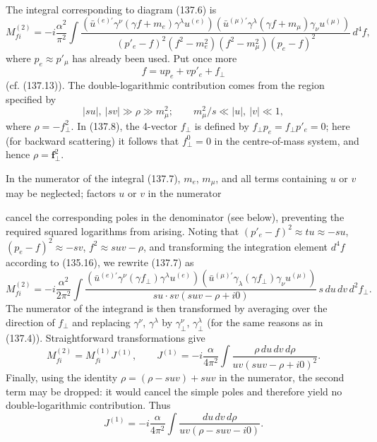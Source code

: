 The integral corresponding to diagram (137.6) is
\begin{equation}
M_{fi}^{(2)}=-i\frac{\alpha^2}{\pi^2}\int
\frac{(\bar u^{(e)'}\gamma^\nu(\gamma f+m_e)\gamma^\lambda u^{(e)})
(\bar u^{(\mu)'}\gamma^\lambda(\gamma f+m_\mu)\gamma_\nu u^{(\mu)})}
{(p'_e-f)^2(f^2-m_e^2)(f^2-m_\mu^2)(p_e-f)^2}\,d^4f,
\tag{137.7}
\end{equation}
where $p_e\approx p'_\mu$ has already been used. Put once more
\begin{equation}
f=up_e+vp'_e+f_\perp
\tag{137.8}
\end{equation}
(cf. (137.13)). The double-logarithmic contribution comes from the region specified by
\begin{equation}
|su|,\ |sv|\gg\rho\gg m_\mu^2;\qquad m_\mu^2/s\ll|u|,\ |v|\ll1,
\tag{137.9}
\end{equation}
where $\rho=-f_\perp^2$. In (137.8), the 4-vector $f_\perp$ is defined by $f_\perp p_e=f_\perp p'_e=0$; here (for backward scattering) it follows that $f_\perp^0=0$ in the centre-of-mass system, and hence $\rho=\mathbf f_\perp^2$.

In the numerator of the integral (137.7), $m_e$, $m_\mu$, and all terms containing $u$ or $v$ may be neglected; factors $u$ or $v$ in the numerator

cancel the corresponding poles in the denominator (see below), preventing the required squared logarithms from arising. Noting that $(p'_e-f)^2\approx tu\approx-su$, $(p_e-f)^2\approx-sv$, $f^2\approx suv-\rho$, and transforming the integration element $d^4f$ according to (135.16), we rewrite (137.7) as
\[
M_{fi}^{(2)}=-i\frac{\alpha^2}{2\pi^2}\int
\frac{(\bar u^{(e)'}\gamma^\nu(\gamma f_\perp)\gamma^\lambda u^{(e)})
(\bar u^{(\mu)'}\gamma_\lambda(\gamma f_\perp)\gamma_\nu u^{(\mu)})}
{su\cdot sv(suv-\rho+i0)}\,s\,du\,dv\,d^2f_\perp.
\]
The numerator of the integrand is then transformed by averaging over the direction of $f_\perp$ and replacing $\gamma^\nu$, $\gamma^\lambda$ by $\gamma^\nu_\perp$, $\gamma^\lambda_\perp$ (for the same reasons as in (137.4)). Straightforward transformations give
\begin{equation}
M_{fi}^{(2)}=M_{fi}^{(1)}J^{(1)},\qquad
J^{(1)}=-i\frac{\alpha}{4\pi^2}\int
\frac{\rho\,du\,dv\,d\rho}{uv(suv-\rho+i0)^2}.
\tag{137.10}
\end{equation}
Finally, using the identity $\rho=(\rho-suv)+suv$ in the numerator, the second term may be dropped: it would cancel the simple poles and therefore yield no double-logarithmic contribution. Thus
\begin{equation}
J^{(1)}=-i\frac{\alpha}{4\pi^2}\int
\frac{du\,dv\,d\rho}{uv(\rho-suv-i0)}.
\tag{137.11}
\end{equation}

